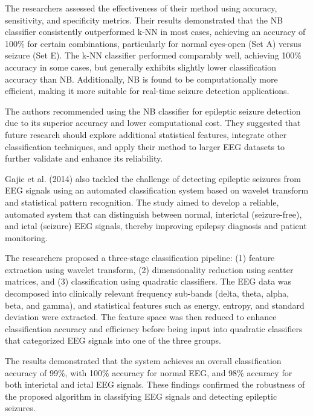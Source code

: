 \documentclass{article}
\begin{document}
The researchers assessed the effectiveness of their method using accuracy, sensitivity, and specificity metrics. Their results demonstrated that the NB classifier consistently outperformed k-NN in most cases, achieving an accuracy of 100\% for certain combinations, particularly for normal eyes-open (Set A) versus seizure (Set E). The k-NN classifier performed comparably well, achieving 100\% accuracy in some cases, but generally exhibits slightly lower classification accuracy than NB. Additionally, NB is found to be computationally more efficient, making it more suitable for real-time seizure detection applications.

The authors recommended using the NB classifier for epileptic seizure detection due to its superior accuracy and lower computational cost. They suggested that future research should explore additional statistical features, integrate other classification techniques, and apply their method to larger EEG datasets to further validate and enhance its reliability.

Gajic et al. (2014) \cite{gajic2014} also tackled the challenge of detecting epileptic seizures from EEG signals using an automated classification system based on wavelet transform and statistical pattern recognition. The study aimed to develop a reliable, automated system that can distinguish between normal, interictal (seizure-free), and ictal (seizure) EEG signals, thereby improving epilepsy diagnosis and patient monitoring.

The researchers proposed a three-stage classification pipeline: (1) feature extraction using wavelet transform, (2) dimensionality reduction using scatter matrices, and (3) classification using quadratic classifiers. The EEG data was decomposed into clinically relevant frequency sub-bands (delta, theta, alpha, beta, and gamma), and statistical features such as energy, entropy, and standard deviation were extracted. The feature space was then reduced to enhance classification accuracy and efficiency before being input into quadratic classifiers that categorized EEG signals into one of the three groups.

The results demonstrated that the system achieves an overall classification accuracy of 99\%, with 100\% accuracy for normal EEG, and 98\% accuracy for both interictal and ictal EEG signals. These findings confirmed the robustness of the proposed algorithm in classifying EEG signals and detecting epileptic seizures.
\end{document}
